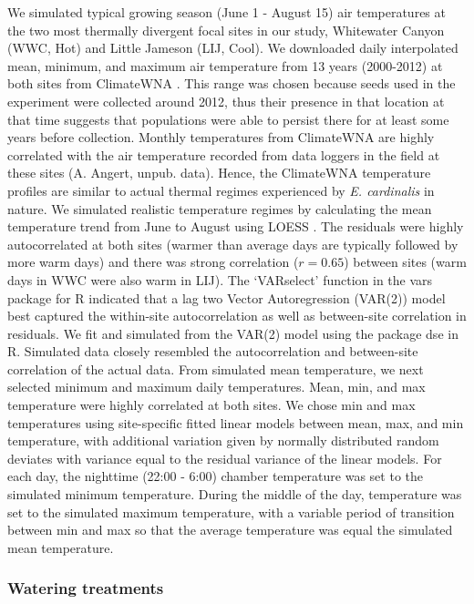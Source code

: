 \documentclass[11pt, oneside]{article}
\newcommand{\pkg}[1]{{\fontseries{b}\selectfont #1}}
\begin{document}
We simulated typical growing season (June 1 - August 15) air temperatures at the two most thermally divergent focal sites in our study, Whitewater Canyon (WWC, Hot) and Little Jameson (LIJ, Cool). We downloaded daily interpolated mean, minimum, and maximum air temperature from 13 years (2000-2012) at both sites from ClimateWNA \citep{Wang_etal_2012}. This range was chosen because seeds used in the experiment were collected around 2012, thus their presence in that location at that time suggests that populations were able to persist there for at least some years before collection. Monthly temperatures from ClimateWNA are highly correlated with the air temperature recorded from data loggers in the field at these sites (A. Angert, unpub. data). Hence, the ClimateWNA temperature profiles are similar to actual thermal regimes experienced by \textit{E. cardinalis} in nature. We simulated realistic temperature regimes by calculating the mean temperature trend from June to August using LOESS \citep{Cleveland_etal_1992}. The residuals were highly autocorrelated at both sites (warmer than average days are typically followed by more warm days) and there was strong correlation ($r = 0.65$) between sites (warm days in WWC were also warm in LIJ). The `VARselect' function in the \pkg{vars} package for R \citep{Pfaff_2008} indicated that a lag two Vector Autoregression (VAR(2)) model best captured the within-site autocorrelation as well as between-site correlation in residuals. We fit and simulated from the VAR(2) model using the package \pkg{dse} \citep{Gilbert_2014} in R. Simulated data closely resembled the autocorrelation and between-site correlation of the actual data. From simulated mean temperature, we next selected minimum and maximum daily temperatures. Mean, min, and max temperature were highly correlated at both sites. We chose min and max temperatures using site-specific fitted linear models between mean, max, and min temperature, with additional variation given by normally distributed random deviates with variance equal to the residual variance of the linear models. For each day, the nighttime (22:00 - 6:00) chamber temperature was set to the simulated minimum temperature. During the middle of the day, temperature was set to the simulated maximum temperature, with a variable period of transition between min and max so that the average temperature was equal the simulated mean temperature.

\subsubsection*{Watering treatments}
\end{document}
